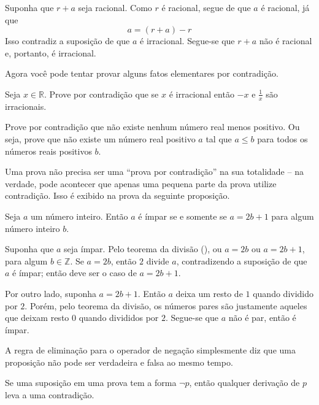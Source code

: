 \begin{itemizar}
\begin{cproof}
Suponha que $r+a$ seja racional. Como $r$ é racional, segue de  que $a$ é racional, já que
\[
a = (r+a) - r
\]
Isso contradiz a suposição de que $a$ é irracional. Segue-se que $r+a$ não é racional e, portanto, é irracional.
\end{cproof}

Agora você pode tentar provar alguns fatos elementares por contradição.

\begin{exercise}
\label{exNegationAndReciprocalOfIrrationalNumbers}
Seja $x \in \mathbb{R}$. Prove por contradição que se $x$ é irracional então $-x$ e $\frac{1}{x}$ são irracionais.
\end{exercise}

\begin{exercise}
\label{exNoLeastPositiveReal}
Prove por contradição que não existe nenhum número real menos positivo. Ou seja, prove que não existe um número real positivo $a$ tal que $a \le b$ para todos os números reais positivos $b$.
\end{exercise}

Uma prova não precisa ser uma “prova por contradição” na sua totalidade – na verdade, pode acontecer que apenas uma pequena parte da prova utilize contradição. Isso é exibido na prova da seguinte proposição.

\begin{proposition}
\label{propOddIffRemainderOfOne}
Seja $a$ um número inteiro. Então $a$ é ímpar se e somente se $a=2b+1$ para algum número inteiro $b$.
\end{proposition}
\begin{cproof}

Suponha que $a$ seja ímpar. Pelo teorema da divisão (), ou $a=2b$ ou $a=2b+1$, para algum $b \in \mathbb{Z}$. Se $a=2b$, então $2$ divide $a$, contradizendo a suposição de que $a$ é ímpar; então deve ser o caso de $a=2b+1$.

Por outro lado, suponha $a=2b+1$. Então $a$ deixa um resto de $1$ quando dividido por $2$. Porém, pelo teorema da divisão, os números pares são justamente aqueles que deixam resto $0$ quando divididos por $2$. Segue-se que $a$ não é par, então é ímpar.
\end{cproof}


A regra de eliminação para o operador de negação \elimrule{\neg} simplesmente diz que uma proposição não pode ser verdadeira e falsa ao mesmo tempo.

\begin{strategy}
\label{strAssumingNegations}
Se uma suposição em uma prova tem a forma $\neg p$, então qualquer derivação de $p$ leva a uma contradição.
\end{strategy}


\end{itemizar}
